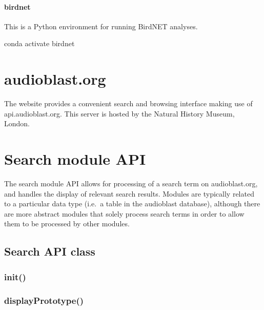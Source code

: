 \documentclass[
]{book}
\newenvironment{Shaded}{\begin{snugshade}}{\end{snugshade}}
\newcommand{\ExtensionTok}[1]{#1}
\newcommand{\NormalTok}[1]{#1}
\begin{document}
\hypertarget{birdnet}{%
\subsubsection{birdnet}\label{birdnet}}

This is a Python environment for running BirdNET analyses.

\begin{Shaded}
\begin{Highlighting}[]
\ExtensionTok{conda}\NormalTok{ activate birdnet}
\end{Highlighting}
\end{Shaded}

\hypertarget{audioblast.org}{%
\chapter{audioblast.org}\label{audioblast.org}}

The website provides a convenient search and browsing interface making use of api.audioblast.org. This server is hosted by the Natural History Museum, London.

\hypertarget{search-module-api}{%
\chapter{Search module API}\label{search-module-api}}

The search module API allows for processing of a search term on audioblast.org, and handles the display of relevant search results. Modules are typically related to a particular data type (i.e.~a table in the audioblast database), although there are more abstract modules that solely process search terms in order to allow them to be processed by other modules.

\hypertarget{search-api-class}{%
\section{Search API class}\label{search-api-class}}

\hypertarget{init}{%
\subsection{init()}\label{init}}

\hypertarget{displayprototype}{%
\subsection{displayPrototype()}\label{displayprototype}}
\end{document}
